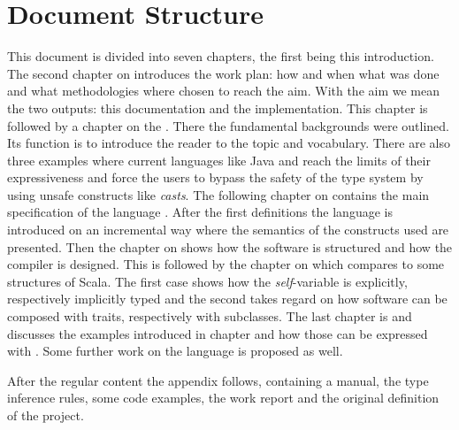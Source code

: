 \section{Document Structure}
This document is divided into seven chapters, the first being this introduction. The second chapter on
\emph{} introduces the work plan: how and
when what was done and what methodologies where chosen to reach
the aim. With the aim we mean the two outputs: this documentation and
the implementation. This chapter is followed by a chapter on the
\emph{}. There the fundamental
backgrounds were outlined. Its function is to introduce the
reader to the topic and vocabulary. There are also three examples
where current languages like Java and \cs reach the limits of their expressiveness
and force the users to bypass the safety of the type system
by using unsafe constructs like \emph{casts}. The following
chapter on \emph{} contains
the main specification of the language \ooplss. After the first
definitions the language is introduced on an incremental way where
the semantics of the constructs used are presented. Then the chapter on
\emph{} shows how the software is
structured and how the compiler is designed. This is followed by the
chapter on \emph{} which compares \ooplss to some structures of Scala. The first case shows how the
\emph{self}-variable is explicitly, respectively implicitly typed and
the second takes regard on how software can be composed with traits,
respectively with subclasses. The last chapter is
\emph{} and discusses the examples
introduced in chapter \emph{} and how
those can be expressed with \ooplss. Some further work on the language
is proposed as well.

After the regular content the appendix follows, containing a manual, the type
inference rules, some code examples, the work report and the original
definition of the project.


